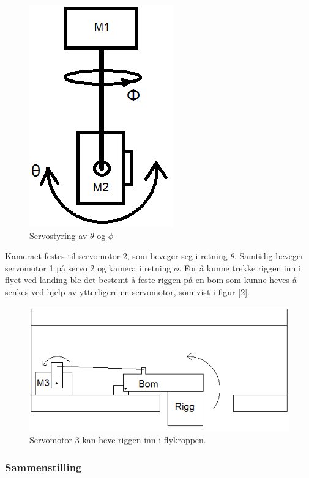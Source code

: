 \begin{figure}[h!]
	\centering
	\includegraphics[scale=0.5]{img/BasicRiggIde.png}
	\caption{Servostyring av $\theta$ og $\phi$}
	\label{fig:IdeRigg}
\end{figure}

Kameraet festes til servomotor 2, som beveger seg i retning $\theta$. Samtidig beveger servomotor 1 på servo 2 og kamera i retning $\phi$. For å kunne trekke riggen inn i flyet ved landing ble det bestemt å feste riggen på en bom som kunne heves å senkes ved hjelp av ytterligere en servomotor, som vist i figur [\ref{fig:bom}].

\begin{figure}[h!]
	\centering
	\includegraphics[scale=0.5]{img/Motor3.png}
	\caption{Servomotor 3 kan heve riggen inn i flykroppen.}
	\label{fig:bom}
\end{figure}

\subsubsection{Sammenstilling}

